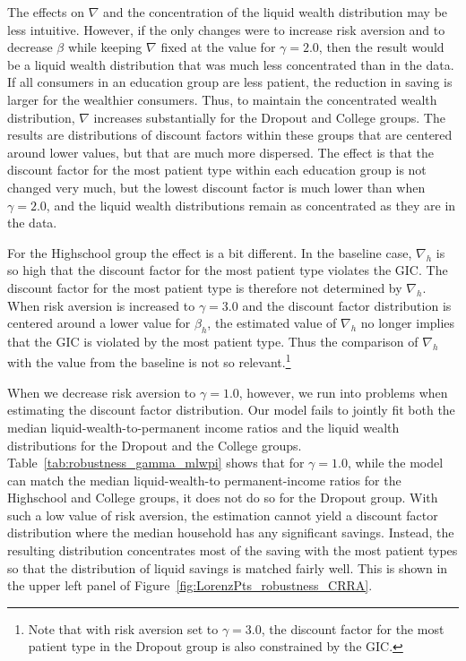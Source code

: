 \documentclass[\econtexRoot/HAFiscal]{subfiles}
\begin{document}
The effects on $\nabla$ and the concentration of the liquid wealth distribution may be less intuitive.
However, if the only changes were to increase risk aversion and to decrease $\beta$ while keeping $\nabla$ fixed at the value for $\gamma=2.0$, then the result would be a liquid wealth distribution that was much less concentrated than in the data.
If all consumers in an education group are less patient, the reduction in saving is larger for the wealthier consumers.
Thus, to maintain the concentrated wealth distribution, $\nabla$ increases substantially for the Dropout and College groups.
The results are distributions of discount factors within these groups that are centered around lower values, but that are much more dispersed.
The effect is that the discount factor for the most patient type within each education group is not changed very much, but the lowest discount factor is much lower than when $\gamma=2.0$, and the liquid wealth distributions remain as concentrated as they are in the data.

For the Highschool group the effect is a bit different.
In the baseline case, $\nabla_h$ is so high that the discount factor for the most patient type violates the GIC.
The discount factor for the most patient type is therefore not determined by $\nabla_h$.
When risk aversion is increased to $\gamma=3.0$ and the discount factor distribution is centered around a lower value for $\beta_h$, the estimated value of $\nabla_h$ no longer implies that the GIC is violated by the most patient type.
Thus the comparison of $\nabla_h$ with the value from the baseline is not so relevant.\footnote{Note that with risk aversion set to $\gamma=3.0$, the discount factor for the most patient type in the Dropout group is also constrained by the GIC.}

When we decrease risk aversion to $\gamma=1.0$, however, we run into problems when estimating the discount factor distribution.
Our model fails to jointly fit both the median liquid-wealth-to-permanent income ratios and the liquid wealth distributions for the Dropout and the College groups.
Table~\ref{tab:robustness_gamma_mlwpi} shows that for $\gamma=1.0$, while the model can match the median liquid-wealth-to permanent-income ratios for the Highschool and College groups, it does not do so for the Dropout group.
With such a low value of risk aversion, the estimation cannot yield a discount factor distribution where the median household has any significant savings.
Instead, the resulting distribution concentrates most of the saving with the most patient types so that the distribution of liquid savings is matched fairly well.
This is shown in the upper left panel of Figure~\ref{fig:LorenzPts_robustness_CRRA}.
\end{document}
